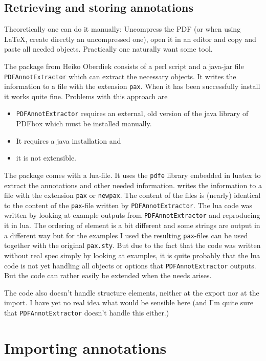 \documentclass[DIV=12,parskip=half-,bibliography=totoc]{scrartcl}
\begin{document}
\subsection{Retrieving and storing annotations}

Theoretically one can do it manually: Uncompress the PDF (or when using \LaTeX, create directly an uncompressed one), open it in an editor and copy and paste all needed objects. Practically one naturally want some tool.

The  package from Heiko Oberdiek consists of a perl script and a java-jar file \texttt{PDFAnnotExtractor} which can extract the necessary objects. It writes the information to a file with the extension \texttt{pax}.
When it has been successfully install it works quite fine. Problems with this approach are
\begin{itemize}
\item \texttt{PDFAnnotExtractor} requires an external, old version of the java library of PDFbox which must be installed manually.
\item It requires a java installation and
\item it is not extensible.
\end{itemize}

The  package comes with a lua-file. It uses the \texttt{pdfe} library embedded in luatex to extract the annotations and other needed information.  writes the information to a file with the extension \texttt{pax} or \texttt{newpax}. The content of the files is (nearly) identical to the content of the \texttt{pax}-file written by \texttt{PDFAnnotExtractor}. The lua code was written by looking at example outputs from \texttt{PDFAnnotExtractor} and reproducing it in lua. The ordering of element is a bit different and some strings are output in a different way but for the examples I used the resulting \texttt{pax}-files can be used together with the original \texttt{pax.sty}. But due to the fact that the code was written without real spec simply by looking at examples, it is quite probably that the lua code is not yet handling all objects or options that \texttt{PDFAnnotExtractor} outputs.  But the code can rather easily be extended when the needs arises.

The code also doesn't handle structure elements, neither at the export nor at the import. I have yet no real idea what would be sensible here (and I'm quite sure that \texttt{PDFAnnotExtractor}  doesn't handle this either.)


\section{Importing annotations}
\end{document}
